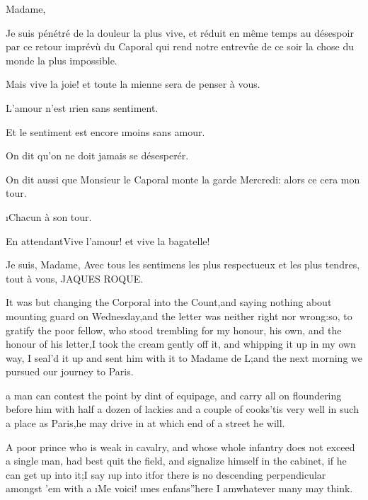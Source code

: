 \documentclass[twoside]{article}
\begin{document}


Madame,

Je suis pénétré de la douleur la plus vive, et réduit en même temps au
désespoir par ce retour imprévù du Caporal qui rend notre entrevûe de ce
soir la chose du monde la plus impossible.

Mais vive la joie! et toute la mienne sera de penser à vous.

L’amour n’est \i{rien} sans sentiment.

Et le sentiment est encore \i{moins} sans amour.

On dit qu’on ne doit jamais se désesperér.

On dit aussi que Monsieur le Caporal monte la garde Mercredi: alors ce
cera mon tour.

                           \i{Chacun à son tour}.

En attendant\tsk Vive l’amour! et vive la bagatelle!

                                                          Je suis, Madame,
                                          Avec tous les sentimens les plus
                                          respectueux et les plus tendres,
                                                              tout à vous,
                                                             JAQUES ROQUE.

It was but changing the Corporal into the Count,\tsk and saying nothing about
mounting guard on Wednesday,\tsk and the letter was neither right nor
wrong:\tsk so, to gratify the poor fellow, who stood trembling for my honour,
his own, and the honour of his letter,\tsk I took the cream gently off it,
and whipping it up in my own way, I seal’d it up and sent him with it to
Madame de L\tsk ;\tsk and the next morning we pursued our journey to Paris.






 a man can contest the point by dint of equipage, and carry all on
floundering before him with half a dozen of lackies and a couple of
cooks\tsk ’tis very well in such a place as Paris,\tsk he may drive in at which
end of a street he will.

A poor prince who is weak in cavalry, and whose whole infantry does not
exceed a single man, had best quit the field, and signalize himself in
the cabinet, if he can get up into it;\tsk I say \i{up into it}\tsk for there is no
descending perpendicular amongst ’em with a \lqq \i{Me voici}! \i{mes
enfans}”\tsk here I am\tsk whatever many may think.
\end{document}

